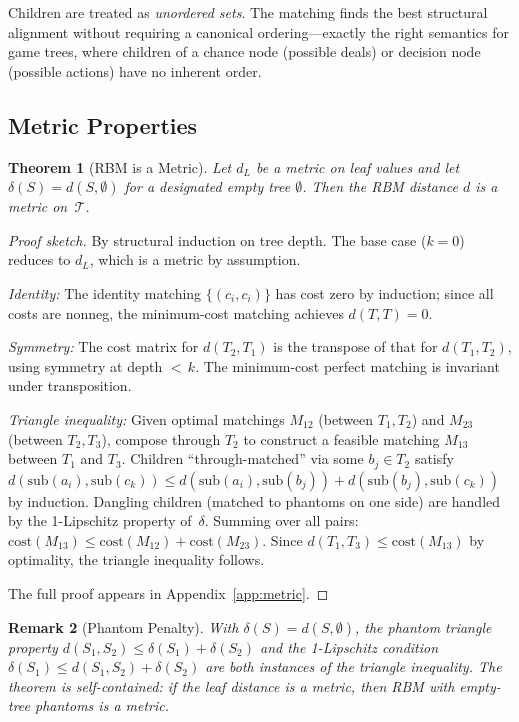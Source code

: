 \documentclass[11pt]{article}
\newtheorem{theorem}{Theorem}[section]
\newtheorem{remark}[theorem]{Remark}
\newcommand{\sub}{\mathrm{sub}}
\newcommand{\cost}{\mathrm{cost}}
\newcommand{\calT}{\mathcal{T}}
\begin{document}
Children are treated as \emph{unordered sets}. The matching finds the
best structural alignment without requiring a canonical ordering---exactly
the right semantics for game trees, where children of a chance node
(possible deals) or decision node (possible actions) have no inherent
order.

\subsection{Metric Properties}

\begin{theorem}[RBM is a Metric]
\label{thm:metric}
Let $d_L$ be a metric on leaf values and let $\delta(S) = d(S,
\emptyset)$ for a designated empty tree $\emptyset$. Then the RBM
distance $d$ is a metric on~$\calT$.
\end{theorem}

\begin{proof}[Proof sketch]
By structural induction on tree depth. The base case ($k=0$) reduces to
$d_L$, which is a metric by assumption.

\emph{Identity:} The identity matching $\{(c_i, c_i)\}$ has cost zero
by induction; since all costs are nonneg, the minimum-cost matching
achieves $d(T, T) = 0$.

\emph{Symmetry:} The cost matrix for $d(T_2, T_1)$ is the transpose of
that for $d(T_1, T_2)$, using symmetry at depth ${<}\,k$. The
minimum-cost perfect matching is invariant under transposition.

\emph{Triangle inequality:} Given optimal matchings $M_{12}$ (between
$T_1, T_2$) and $M_{23}$ (between $T_2, T_3$), compose through $T_2$
to construct a feasible matching $M_{13}$ between $T_1$ and $T_3$.
Children ``through-matched'' via some $b_j \in T_2$ satisfy
$d(\sub(a_i), \sub(c_k)) \le d(\sub(a_i), \sub(b_j)) + d(\sub(b_j),
\sub(c_k))$ by induction. Dangling children (matched to phantoms on one
side) are handled by the 1-Lipschitz property of~$\delta$. Summing over
all pairs: $\cost(M_{13}) \le \cost(M_{12}) + \cost(M_{23})$. Since
$d(T_1, T_3) \le \cost(M_{13})$ by optimality, the triangle inequality
follows.

The full proof appears in Appendix~\ref{app:metric}.
\end{proof}

\begin{remark}[Phantom Penalty]
\label{rem:phantom}
With $\delta(S) = d(S, \emptyset)$, the phantom triangle property
$d(S_1, S_2) \le \delta(S_1) + \delta(S_2)$ and the 1-Lipschitz
condition $\delta(S_1) \le d(S_1, S_2) + \delta(S_2)$ are both
instances of the triangle inequality. The theorem is self-contained: if
the leaf distance is a metric, then RBM with empty-tree phantoms is a
metric.
\end{remark}
\end{document}
